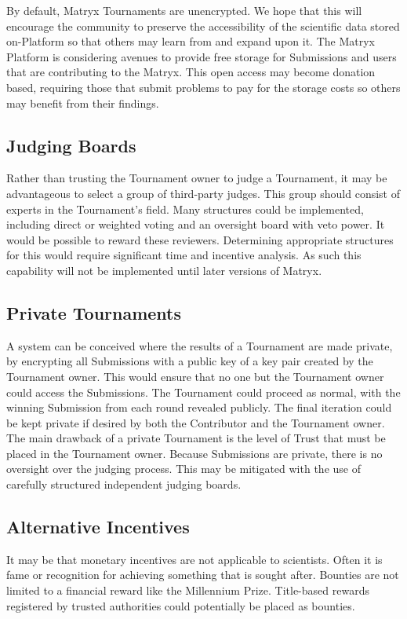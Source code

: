 \documentclass[a4paper, 10pt, conference]{ieeeconf}      %
\begin{document}
By default, Matryx Tournaments are unencrypted. We hope that this will encourage the community to preserve the accessibility of the scientific data stored on-Platform so that others may learn from and expand upon it.
The Matryx Platform is considering avenues to provide free storage for Submissions and users that are contributing to the Matryx.
This open access may become donation based, requiring those that submit problems to pay for the storage costs so others may benefit from their findings.

\subsection{Judging Boards} \label{judgingboards}
Rather than trusting the Tournament owner to judge a Tournament, it may be advantageous to select a group of third-party judges.
This group should consist of experts in the Tournament’s field. 
Many structures could be implemented, including direct or weighted voting and an oversight board with veto power. 
It would be possible to reward these reviewers. 
Determining appropriate structures for this would require significant time and incentive analysis.
As such this capability will not be implemented until later versions of Matryx.

\subsection{Private Tournaments}\label{privateTournaments}
A system can be conceived where the results of a Tournament are made private, by encrypting all Submissions with a public key of a key pair created by the Tournament owner. 
This would ensure that no one but the Tournament owner could access the Submissions. 
The Tournament could proceed as normal, with the winning Submission from each round revealed publicly. 
The final iteration could be kept private if desired by both the Contributor and the Tournament owner. 
The main drawback of a private Tournament is the level of Trust that must be placed in the Tournament owner. 
Because Submissions are private, there is no oversight over the judging process. 
This may be mitigated with the use of carefully structured independent judging boards.

\subsection{Alternative Incentives}\label{alternative incentives}
It may be that monetary incentives are not applicable to scientists. 
Often it is fame or recognition for achieving something that is sought after. 
Bounties are not limited to a financial reward like the Millennium Prize. 
Title-based rewards registered by trusted authorities could potentially be placed as bounties.
\end{document}
